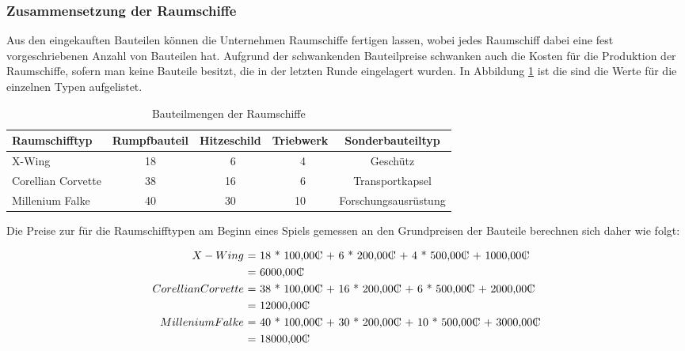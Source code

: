 \subsubsection{Zusammensetzung der Raumschiffe}
\label{subsub:spielwelt-datenbasis-raumschiffe-zusammensetzung}

Aus den eingekauften Bauteilen können die Unternehmen Raumschiffe fertigen lassen, wobei jedes Raumschiff dabei eine fest vorgeschriebenen Anzahl von Bauteilen hat. Aufgrund der schwankenden Bauteilpreise schwanken auch die Kosten für die Produktion der Raumschiffe, sofern man keine Bauteile besitzt, die in der letzten Runde eingelagert wurden. In Abbildung \ref{tab:spielwelt-datenbasis-raumschiffe-zusammensetzung} ist die sind die Werte für die einzelnen Typen aufgelistet.

\begin{table}[ht]\small
     \centering
     \begin{tabular}{ | l | c | c | c | c |  }
          \hline
          Raumschifftyp & Rumpfbauteil & Hitzeschild & Triebwerk & Sonderbauteiltyp \\
          \hline \hline
          X-Wing & 18 & \ 6 & \ 4 & Geschütz\\ \hline
          Corellian Corvette & 38 & 16 & \ 6 & Transportkapsel \\ \hline
          Millenium Falke & 40 & 30 & 10 & Forschungsausrüstung \\
          \hline
     \end{tabular}
     \caption{Bauteilmengen der Raumschiffe}
     \label{tab:spielwelt-datenbasis-raumschiffe-zusammensetzung}
\end{table}

Die Preise zur für die Raumschifftypen am Beginn eines Spiels gemessen an den Grundpreisen der Bauteile berechnen sich daher wie folgt:

\begin{align}
          X-Wing\ &\text{= 18 * 100,00\curr{} +  6 * 200,00\curr{} +  4 * 500,00\curr{} + 1000,00\curr{}}\nonumber \\
          \ & \text{=  6000,00\curr{}}\nonumber \\
          Corellian Corvette\ &\text{= 38 * 100,00\curr{} + 16 * 200,00\curr{} +  6 * 500,00\curr{} + 2000,00\curr{}}\nonumber \\
          \ & \text{= 12000,00\curr{}}\nonumber \\
          Millenium Falke\ &\text{= 40 * 100,00\curr{} + 30 * 200,00\curr{} + 10 * 500,00\curr{} + 3000,00\curr{}}\nonumber \\
          \ & \text{= 18000,00\curr{}}\nonumber \\
\end{align}


